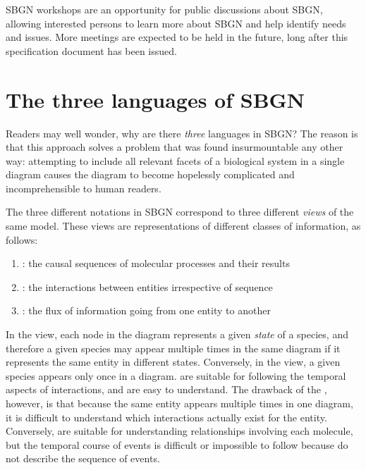 SBGN workshops are an opportunity for public discussions about SBGN, allowing interested persons to learn more about SBGN and help identify needs and issues.  More meetings are expected to be held in the future, long after this specification document has been issued.


\section{The three languages of SBGN}
\label{sec:languages}

Readers may well wonder, why are there \emph{three} languages in SBGN?  The reason is that this approach solves a problem that was found insurmountable any other way: attempting to include all relevant facets of a biological system in a single diagram causes the diagram to become hopelessly complicated and incomprehensible to human readers.

The three different notations in SBGN correspond to three different \emph{views} of the same model.  These views are representations of different classes of information, as follows:

\begin{enumerate}\setlength{\parskip}{0ex}

\item \emph{\PD{}}: the causal sequences of molecular processes and their
  results

\item \emph{\ER{}}: the interactions between entities irrespective of
sequence

\item \emph{\AF{}}: the flux of information going from one entity to
another

\end{enumerate}

In the \PD{} view, each node in the diagram represents a given \emph{state} of a species, and therefore a given species may appear multiple times in the same diagram if it represents the same entity in different states.  Conversely, in the \ER{} view, a given species appears only once in a diagram.  \PDs{} are suitable for following the temporal aspects of interactions, and are easy to understand.  The drawback of the \PD{}, however, is that because the same entity appears multiple times in one diagram, it is difficult to understand which interactions actually exist for the entity.  Conversely, \ERs{} are suitable for understanding relationships involving each molecule, but the temporal course of events is difficult or impossible to follow because \ERs do not describe the sequence of events.

